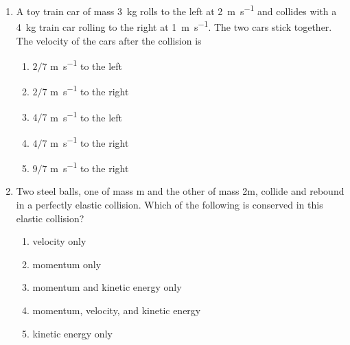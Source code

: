 \documentclass{../../oss-apphys}
\begin{document}
\genheader


\genmultidirections

\gengravity

\raggedcolumns
\begin{multicols}{2}

  \begin{enumerate}[leftmargin=18pt]

  \item A toy train car of mass \SI{3}{\kilo\gram} rolls to the left at
    \SI{2}{\metre\per\second} and collides with a \SI{4}{\kilo\gram} train
    car rolling to the right at \SI{1}{\metre\per\second}. The two cars stick
    together. The velocity of the cars after the collision is
    \begin{enumerate}[noitemsep,topsep=0pt,leftmargin=18pt,label=(\Alph*)]
    \item $2/7$ \si{\metre\per\second} to the left
    \item $2/7$ \si{\metre\per\second} to the right
    \item $4/7$ \si{\metre\per\second} to the left
    \item $4/7$ \si{\metre\per\second} to the right
    \item $9/7$ \si{\metre\per\second} to the right
    \end{enumerate}
    
  \item Two steel balls, one of mass m and the other of mass 2m, collide and
    rebound in a perfectly elastic collision. Which of the following is
    conserved in this elastic collision?
    \begin{enumerate}[noitemsep,topsep=0pt,leftmargin=18pt,label=(\Alph*)]
    \item velocity only
    \item momentum only
    \item momentum and kinetic energy only
    \item momentum, velocity, and kinetic energy
    \item kinetic energy only
    \end{enumerate}
    

\end{enumerate}
\end{multicols}
\end{document}
